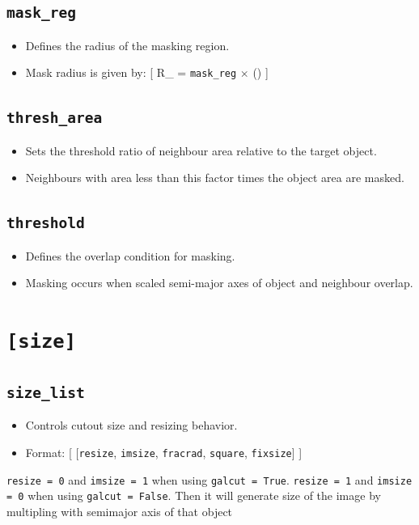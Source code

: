 \documentclass[11pt]{article}
\begin{document}
\subsection{\texttt{mask\_reg}}
\begin{itemize}
\item Defines the radius of the masking region.
\item Mask radius is given by:
[
R\_{} = \texttt{mask\_reg} $\times$ ()
]
\end{itemize}

\subsection{\texttt{thresh\_area}}
\begin{itemize}
\item Sets the threshold ratio of neighbour area relative to the target object.
\item Neighbours with area less than this factor times the object area are masked.
\end{itemize}

\subsection{\texttt{threshold}}
\begin{itemize}
\item Defines the overlap condition for masking.
\item Masking occurs when scaled semi-major axes of object and neighbour overlap.
\end{itemize}


\section{\texttt{[size]}}

\subsection{\texttt{size\_list}}
\begin{itemize}
\item Controls cutout size and resizing behavior.
\item Format:
[
[\texttt{resize}, \texttt{imsize}, \texttt{fracrad}, \texttt{square}, \texttt{fixsize}]
]
\end{itemize}
\texttt{resize = 0} and \texttt{imsize = 1} when using \texttt{galcut = True}. 
\texttt{resize = 1} and \texttt{imsize = 0} when using \texttt{galcut = False}. Then it will generate size of the image by multipling  with semimajor axis of that object 
\end{document}
